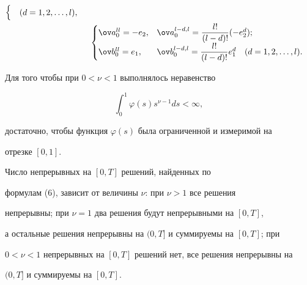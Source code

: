 \begin{thmnonum}
\begin{align*}
\begin{cases}
\quad (d=1,2,\dotsc,l),


\end{cases} 


\\ 


&\ 


\begin{cases} 


\ov a^{ll}_0=-e_2, & \ov a^{l-d,l}_0=\dfrac{l!}{(l-d)!}(-e^d_2);\\ 


\ov b^{ll}_0=e_1, & \ov b^{l-d,l}_0=\dfrac{l!}{(l-d)!}e^d_1 


\quad (d=1,2,\dotsc,l). 


\end{cases}


\end{align*} 


\end{thmnonum} 


 


\begin{note} 


Для того чтобы при $0<\nu<1$ выполнялось неравенство 


$$ 


\int^1_0\varphi(s)s^{\nu-1}ds<\infty,


$$ 


достаточно, чтобы функция $\varphi(s)$ была ограниченной и измеримой на 


отрезке $[0,1]$. 


\end{note} 


 


\begin{note} 


Число непрерывных на $[0,T]$ решений, найденных по 


формулам (6), зависит от величины $\nu$: при $\nu>1$ все решения 


непрерывны; при $\nu=1$ два решения будут непрерывными на $[0,T]$, 


а остальные решения непрерывны на $(0,T]$ и суммируемы на $[0,T]$; при 


$0<\nu<1$ непрерывных на $[0,T]$ решений нет, все решения непрерывны на 


$(0,T]$ и суммируемы на $[0,T]$. 


\end{note} 


